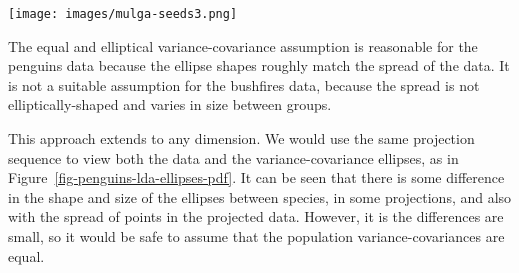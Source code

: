 \documentclass[
  letterpaper,
]{krantz}
\newcommand{\insightbox}[1]{%
\noindent\colorbox{insight!30}{%
\begin{minipage}{0.98\textwidth}%
    \centering%
    \begin{minipage}[c]{0.15\textwidth} %
      \texttt{[image: images/mulga-seeds3.png]} %
    \end{minipage}%
    \hfill %
    \begin{minipage}[c]{0.8\textwidth} %
      \bigskip%
      \textsf{#1}%
      \bigskip%
    \end{minipage}%
    \hspace*{3mm}%
  \end{minipage}%
}%
}
\begin{document}

\insightbox{The equal and elliptical variance-covariance assumption is reasonable for the penguins data because the ellipse shapes roughly match the spread of the data. It is not a suitable assumption for the bushfires data, because the spread is not elliptically-shaped and varies in size between groups.}

This approach extends to any dimension. We would use the same projection
sequence to view both the data and the variance-covariance ellipses, as
in Figure~\ref{fig-penguins-lda-ellipses-pdf}. It can be seen that there
is some difference in the shape and size of the ellipses between
species, in some projections, and also with the spread of points in the
projected data. However, it is the differences are small, so it would be
safe to assume that the population variance-covariances are equal.
\end{document}
